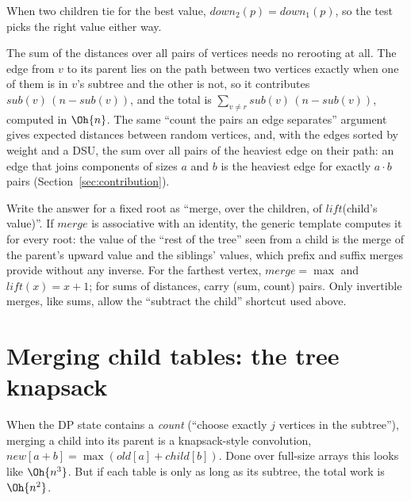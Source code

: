 When two children tie for the best value, $\mathit{down}_2(p) = \mathit{down}_1(p)$, so the test 
picks the right value either way.

\begin{trick}
The sum of the distances over all pairs of vertices needs no rerooting at all. The edge from $v$ to its parent lies on the path
between two vertices exactly when one of them is in $v$'s subtree and the other is not, so it contributes
$\mathit{sub}(v)\,(n - \mathit{sub}(v))$, and the total is $\sum_{v \ne r} \mathit{sub}(v)\,(n - \mathit{sub}(v))$, computed in
$\Oh{n}$. The same ``count the pairs an edge separates'' argument gives expected distances between random vertices, and, with the
edges sorted by weight and a DSU, the sum over all pairs of the heaviest edge on their path: an edge that joins components of
sizes $a$ and $b$ is the heaviest edge for exactly $a \cdot b$ pairs (Section~\ref{sec:contribution}).
\end{trick}

\begin{trick}
Write the answer for a fixed root as ``merge, over the children, of $\mathit{lift}$(child's value)''. If $\mathit{merge}$ is
associative with an identity, the generic template computes it for every root: the value of the ``rest of the tree'' seen from a
child is the merge of the parent's upward value and the siblings' values, which prefix and suffix merges provide without any
inverse. For the farthest vertex, $\mathit{merge} = \max$ and $\mathit{lift}(x) = x + 1$; for sums of distances, carry (sum, count)
pairs. Only invertible merges, like sums, allow the ``subtract the child'' shortcut used above.
\end{trick}

\section[Merging child tables]{Merging child tables: the tree knapsack \hfill \plat}\label{sec:treeknap}

When the DP state contains a \emph{count} (``choose exactly $j$ vertices in the subtree''), merging a child into its parent is a
knapsack-style convolution, $\mathit{new}[a + b] = \max(\mathit{old}[a] + \mathit{child}[b])$. Done over full-size arrays this looks
like $\Oh{n^3}$. But if each table is only as long as its subtree, the total work is $\Oh{n^2}$.

